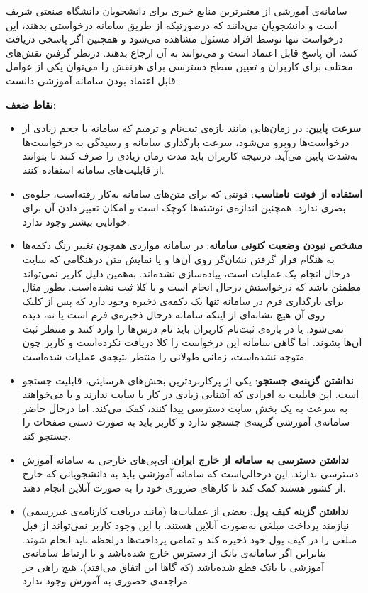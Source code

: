 {\begin{enumerate}[a)]
\begin{itemize}
سامانه‌ی آموزشی از معتبرترین منابع خبری برای دانشجویان دانشگاه صنعتی شریف است و دانشجویان می‌دانند که درصورتیکه از طریق سامانه درخواستی بدهند، این درخواست تنها توسط افراد مسئول مشاهده می‌شود و همچنین اگر پاسخی دریافت کنند، آن پاسخ قابل اعتماد است و می‌توانند به آن ارجاع بدهند. درنظر گرفتن نقش‌های مختلف برای کاربران و تعیین سطح دسترسی برای هرنقش را می‌توان یکی از عوامل قابل اعتماد بودن سامانه آموزشی دانست. 
\end{itemize}
\textbf{نقاط ضعف}:
\begin{itemize}
\item \textbf{سرعت پایین}:
در زمان‌هایی مانند بازه‌ی ثبت‌نام و ترمیم که سامانه با حجم زیادی از درخواست‌ها روبرو می‌شود، سرعت بارگذاری سامانه و رسیدگی به درخواست‌ها به‌شدت پایین می‌آید. درنتیجه کاربران باید مدت زمان زیادی را صرف کنند تا بتوانند از قابلیت‌های سامانه استفاده کنند. 
\item \textbf{استفاده از فونت نامناسب}:
فونتی که برای متن‌های سامانه به‌کار رفته‌است، جلوه‌ی بصری ندارد. همچنین اندازه‌ی نوشته‌ها کوچک است و امکان تغییر دادن آن برای خوانایی بیشتر وجود ندارد.
\item \textbf{مشخص نبودن وضعیت کنونی سامانه}:
در سامانه مواردی همچون تغییر رنگ دکمه‌ها به هنگام قرار گرفتن نشان‌گر روی آن‌ها و یا نمایش متن درهنگامی که سایت درحال انجام یک عملیات است، پیاده‌سازی نشده‌اند. به‌همین دلیل کاربر نمی‌تواند مطمئن باشد که درخواستش درحال انجام است و یا کلا ثبت نشده‌است. بطور مثال برای ‌بارگذاری فرم در سامانه تنها یک دکمه‌ی ذخیره وجود دارد که پس از کلیک روی آن هیچ نشانه‌ای از اینکه سامانه درحال ذخیره‌ی فرم است یا نه، دیده نمی‌شود. یا در بازه‌ی ثبت‌نام کاربران باید نام درس‌ها را وارد کنند و منتظر ثبت آن‌ها بشوند. اما گاهی سامانه این درخواست را کلا دریافت نکرده‌است و کاربر چون متوجه نشده‌است، زمانی طولانی را منتظر نتیجه‌ی عملیات شده‌است.
\item \textbf{نداشتن گزینه‌ی جستجو}:
یکی از پرکاربردترین بخش‌های هرسایتی، قابلیت جستجو است. این قابلیت به‌ افرادی که آشنایی زیادی در کار با سایت ندارند و یا می‌خواهند به سرعت به یک بخش سایت دسترسی پیدا کنند، کمک می‌کند. اما درحال حاضر سامانه‌ی آموزشی گزینه‌ی جستجو ندارد و کاربر باید به صورت دستی صفحات را جستجو کند.
\item \textbf{نداشتن دسترسی به سامانه از خارج ایران}:
آی‌پی‌های خارجی به سامانه آموزش دسترسی ندارند. این درحالی‌است که سامانه آموزشی باید به دانشجویانی که خارج از کشور هستند کمک کند تا کارهای ضروری خود را به صورت آنلاین انجام دهند.
\item \textbf{نداشتن گزینه کیف پول}:
بعضی از عملیات‌ها (مانند دریافت کارنامه‌ی غیررسمی) نیازمند پرداخت مبلغی به‌صورت آنلاین هستند. با این وجود کاربر نمی‌تواند از قبل مبلغی را در کیف پول خود ذخیره کند و تمامی پرداخت‌ها درلحظه باید انجام شوند. بنابراین اگر سامانه‌ی بانک از دسترس خارج شده‌باشد و یا ارتباط سامانه‌ی آموزشی با بانک قطع شده‌باشد (که گاها این اتفاق می‌افتد)، هیچ راهی جز مراجعه‌ی حضوری به آموزش وجود ندارد.
\end{itemize}


\end{enumerate}}
